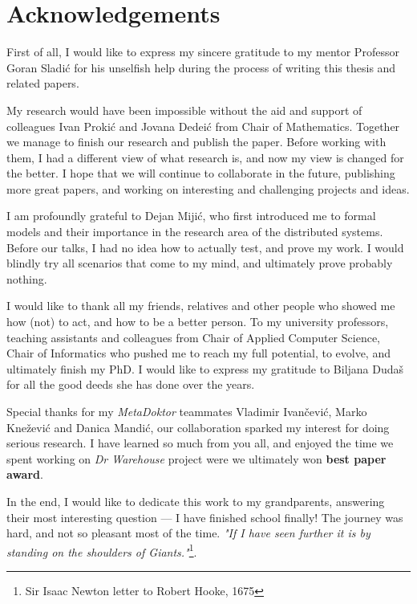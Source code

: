 \chapter*{Acknowledgements}
First of all, I would like to express my sincere gratitude to my mentor Professor Goran Sladi\'c for his unselfish help during the process of writing this thesis and related papers.

My research would have been impossible without the aid and support of colleagues Ivan Proki\'c and Jovana Dedei\'c from Chair of Mathematics. Together we manage to finish our research and publish the paper. Before working with them, I had a different view of what research is, and now my view is changed for the better. I hope that we will continue to collaborate in the future, publishing more great papers, and working on interesting and challenging projects and ideas.

I am profoundly grateful to Dejan Miji\'c, who first introduced me to formal models and their importance in the research area of the distributed systems. Before our talks, I had no idea how to actually test, and prove my work. I would blindly try all scenarios that come to my mind, and ultimately prove probably nothing.

I would like to thank all my friends, relatives and other people who showed me how (not) to act, and how to be a better person. To my university professors, teaching assistants and colleagues from Chair of Applied Computer Science, Chair of Informatics who pushed me to reach my full potential, to evolve, and ultimately finish my PhD. I would like to express my gratitude to Biljana Duda\v s for all the good deeds she has done over the years.

Special thanks for my \emph{MetaDoktor} teammates Vladimir Ivan\v cevi\'c, Marko Kne\v zevi\'c and Danica Mandi\'c, our collaboration sparked my interest for doing serious research. I have learned so much from you all, and enjoyed the time we spent working on \emph{Dr Warehouse} project were we ultimately won \textbf{best paper award}.

In the end, I would like to dedicate this work to my grandparents, answering their most interesting question --- I have finished school finally! The journey was hard, and not so pleasant most of the time. \emph{"If I have seen further it is by standing on the shoulders of Giants."}\footnote{Sir Isaac Newton letter to Robert Hooke, 1675}.